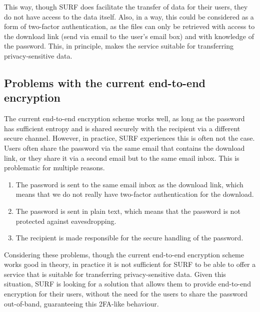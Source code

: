 This way, though SURF does facilitate the transfer of data for their users, they do not have access to the data itself.
Also, in a way, this could be considered as a form of two-factor authentication, as the files can only be retrieved with access to the download link (send via email to the user's email box) and with knowledge of the password.
This, in principle, makes the service suitable for transferring privacy-sensitive data.

\subsection{Problems with the current end-to-end encryption}\label{subsec:problems-with-the-current-end-to-end-encryption}
The current end-to-end encryption scheme works well, as long as the password has sufficient entropy and is shared securely with the recipient via a different secure channel.
However, in practice, SURF experiences this is often not the case.
Users often share the password via the same email that contains the download link, or they share it via a second email but to the same email inbox.
This is problematic for multiple reasons.

\begin{enumerate}
    \item The password is sent to the same email inbox as the download link, which means that we do not really have two-factor authentication for the download.
    \item The password is sent in plain text, which means that the password is not protected against eavesdropping.
    \item The recipient is made responsible for the secure handling of the password.
\end{enumerate}

Considering these problems, though the current end-to-end encryption scheme works good in theory, in practice it is not sufficient for SURF to be able to offer a service that is suitable for transferring privacy-sensitive data.
Given this situation, SURF is looking for a solution that allows them to provide end-to-end encryption for their users, without the need for the users to share the password out-of-band, guaranteeing this 2FA-like behaviour.

